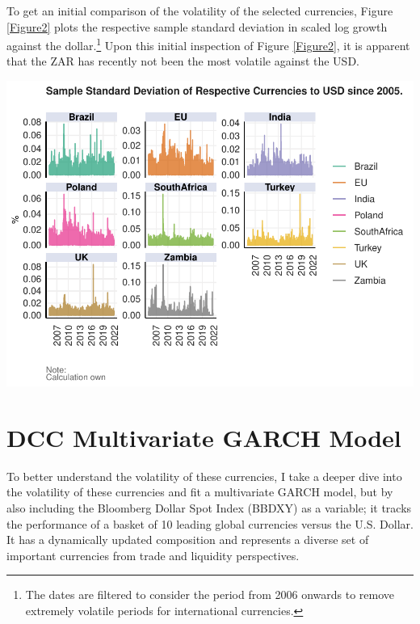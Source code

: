 \documentclass[11pt,preprint, authoryear]{elsarticle}
\let\origfigure\figure
\let\endorigfigure\endfigure
\renewenvironment{figure}[1][2] {
    \expandafter\origfigure\expandafter[H]
} {
    \endorigfigure
}
\numberwithin{equation}{section}
\numberwithin{figure}{section}
\numberwithin{table}{section}
\let\rmarkdownfootnote\footnote%
\def\footnote{\protect\rmarkdownfootnote}
\begin{document}
To get an initial comparison of the volatility of the selected
currencies, Figure \ref{Figure2} plots the respective sample standard
deviation in scaled log growth against the dollar.\footnote{The dates
  are filtered to consider the period from 2006 onwards to remove
  extremely volatile periods for international currencies.} Upon this
initial inspection of Figure \ref{Figure2}, it is apparent that the ZAR
has recently not been the most volatile against the USD.

\begin{figure}[H]

{\centering \includegraphics{Question5_files/figure-latex/Sample SD Plot-1} 

}

\caption{Sample Standard Deviation of Respective Currencies to USD since 2005. \label{Figure2}}\label{fig:Sample SD Plot}
\end{figure}

\hypertarget{dcc-multivariate-garch-model}{%
\section{DCC Multivariate GARCH
Model}\label{dcc-multivariate-garch-model}}

To better understand the volatility of these currencies, I take a deeper
dive into the volatility of these currencies and fit a multivariate
GARCH model, but by also including the Bloomberg Dollar Spot Index
(BBDXY) as a variable; it tracks the performance of a basket of 10
leading global currencies versus the U.S. Dollar. It has a dynamically
updated composition and represents a diverse set of important currencies
from trade and liquidity perspectives.
\end{document}
